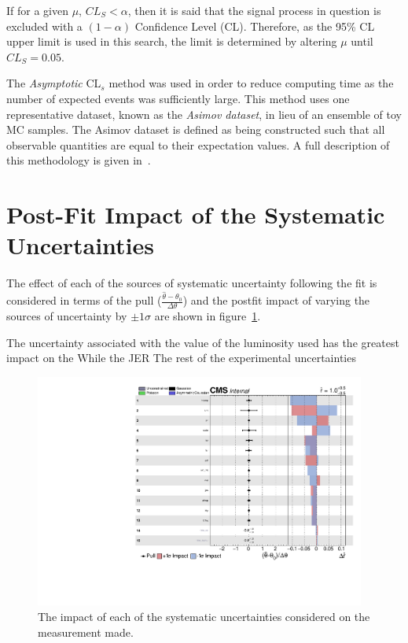 If for a given $\mu$, $CL_{S} < \alpha$, then it is said that the signal process in question is excluded with a $(1 - \alpha)$ Confidence Level (CL).
Therefore, as the 95\% CL upper limit is used in this search, the limit is determined by altering $\mu$  until $CL_{S} = 0.05$.

The \emph{Asymptotic} CL$_{s}$ method was used in order to reduce computing time as the number of expected events was sufficiently large.
This method uses one representative dataset, known as the \emph{Asimov dataset}, in lieu of an ensemble of toy MC samples.
The Asimov dataset is defined as being constructed such that all observable quantities are equal to their expectation values.
A full description of this methodology is given in~\cite{Cowan:2010js}.

\section{Post-Fit Impact of the Systematic Uncertainties}\label{sec:uncertainitiesImpact}
The effect of each of the sources of systematic uncertainty following the fit is considered in terms of the pull ($\frac{ \hat{\theta} - \theta_{0} }{\Delta \theta}$) and the postfit impact of varying the sources of uncertainty by $\pm 1 \sigma$ are shown in figure~\ref{fig:systematicsPull}.

The uncertainty associated with the value of the luminosity used has the greatest impact on the 
While the JER 
The rest of the experimental uncertainties 
 

\begin{figure}[htbp]
\begin{center}
\includegraphics[width=0.97\textwidth]{figs/results/systematicsImpact.pdf}
\caption{The impact of each of the systematic uncertainties considered on the measurement made.}
\label{fig:systematicsPull}
\end{center}
\end{figure}

